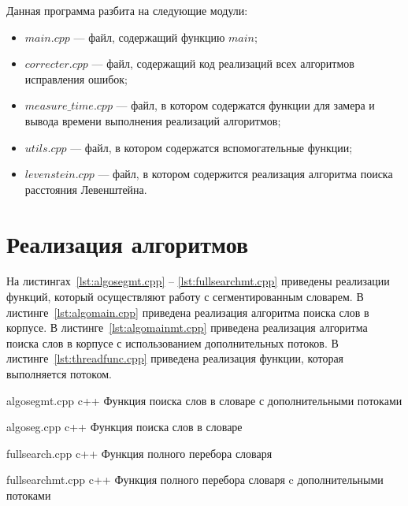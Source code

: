 Данная программа разбита на следующие модули:
\begin{itemize}
	\item $main.cpp$ --- файл, содержащий функцию $main$;
	\item $correcter.cpp$ --- файл, содержащий код реализаций всех алгоритмов исправления ошибок;
	\item $measure\_time.cpp$ --- файл, в котором содержатся функции для замера и вывода времени выполнения реализаций алгоритмов;
	\item $utils.cpp$ --- файл, в котором содержатся вспомогательные функции;
	\item $levenstein.cpp$ --- файл, в котором содержится реализация алгоритма поиска расстояния Левенштейна.
\end{itemize}

\section{Реализация алгоритмов}

На листингах~\ref{lst:algosegmt.cpp} -- \ref{lst:fullsearchmt.cpp} приведены реализации функций, который осуществляют работу с сегментированным словарем.
В листинге~\ref{lst:algomain.cpp} приведена реализация алгоритма поиска слов в корпусе. 
В листинге~\ref{lst:algomainmt.cpp} приведена реализация алгоритма поиска слов в корпусе с использованием дополнительных потоков.
В листинге~\ref{lst:threadfunc.cpp} приведена реализация функции, которая выполняется потоком.

\clearpage
{}
{algosegmt.cpp} %
{c++} %
{Функция поиска слов в словаре с дополнительными потоками} %


\clearpage
{}
{algoseg.cpp} %
{c++} %
{Функция поиска слов в словаре} %

\clearpage
{}
{fullsearch.cpp} %
{c++} %
{Функция полного перебора словаря} %

\clearpage
{}
{fullsearchmt.cpp} %
{c++} %
{Функция полного перебора словаря c дополнительными потоками} %


